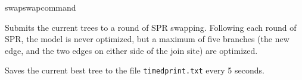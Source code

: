 \begin{command}{swap}{swapcommand}
\begin{poyexamples}
            {Submits the current trees to a round of SPR swapping.  Following each round of SPR,
            the model is never optimized, but a maximum of five branches (the new edge, and the two
                        edges on either side of the join site) are optimized.}
            
            {Saves the current best tree to the file \texttt{timedprint.txt} every 5 seconds.}
            
	\end{poyexamples}

	\begin{poyalso}
	\end{poyalso} 

\end{command}

   
